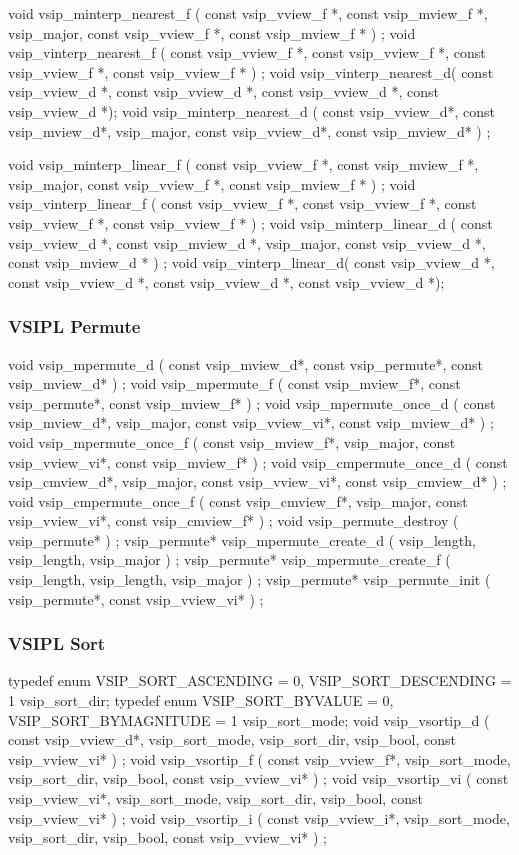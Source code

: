void vsip\_minterp\_nearest\_f ( const vsip\_vview\_f *, const vsip\_mview\_f *, vsip\_major, const vsip\_vview\_f *, const vsip\_mview\_f * ) ;
void vsip\_vinterp\_nearest\_f ( const vsip\_vview\_f *, const vsip\_vview\_f *, const vsip\_vview\_f *, const vsip\_vview\_f * ) ;
void vsip\_vinterp\_nearest\_d( const vsip\_vview\_d *, const vsip\_vview\_d *, const vsip\_vview\_d *, const vsip\_vview\_d *);
void vsip\_minterp\_nearest\_d ( const vsip\_vview\_d*, const vsip\_mview\_d*, vsip\_major, const vsip\_vview\_d*, const vsip\_mview\_d* ) ;

void vsip\_minterp\_linear\_f ( const vsip\_vview\_f *, const vsip\_mview\_f *, vsip\_major, const vsip\_vview\_f *, const vsip\_mview\_f * ) ;
void vsip\_vinterp\_linear\_f ( const vsip\_vview\_f *, const vsip\_vview\_f *, const vsip\_vview\_f *, const vsip\_vview\_f * ) ;
void vsip\_minterp\_linear\_d ( const vsip\_vview\_d *, const vsip\_mview\_d *, vsip\_major, const vsip\_vview\_d *, const vsip\_mview\_d * ) ;
void vsip\_vinterp\_linear\_d( const vsip\_vview\_d *, const vsip\_vview\_d *, const vsip\_vview\_d *, const vsip\_vview\_d *);

\subsubsection*{VSIPL Permute}
void vsip\_mpermute\_d ( const vsip\_mview\_d*, const vsip\_permute*, const vsip\_mview\_d* ) ;
void vsip\_mpermute\_f ( const vsip\_mview\_f*, const vsip\_permute*, const vsip\_mview\_f* ) ;
void vsip\_mpermute\_once\_d ( const vsip\_mview\_d*, vsip\_major, const vsip\_vview\_vi*, const vsip\_mview\_d* ) ;
void vsip\_mpermute\_once\_f ( const vsip\_mview\_f*, vsip\_major, const vsip\_vview\_vi*, const vsip\_mview\_f* ) ;
void vsip\_cmpermute\_once\_d ( const vsip\_cmview\_d*, vsip\_major, const vsip\_vview\_vi*, const vsip\_cmview\_d* ) ;
void vsip\_cmpermute\_once\_f ( const vsip\_cmview\_f*, vsip\_major, const vsip\_vview\_vi*, const vsip\_cmview\_f* ) ;
void vsip\_permute\_destroy ( vsip\_permute* ) ;
vsip\_permute* vsip\_mpermute\_create\_d ( vsip\_length, vsip\_length, vsip\_major ) ;
vsip\_permute* vsip\_mpermute\_create\_f ( vsip\_length, vsip\_length, vsip\_major ) ;
vsip\_permute* vsip\_permute\_init ( vsip\_permute*, const vsip\_vview\_vi* ) ;

\subsubsection*{VSIPL Sort}
typedef enum { VSIP\_SORT\_ASCENDING = 0, VSIP\_SORT\_DESCENDING = 1 } vsip\_sort\_dir;
typedef enum { VSIP\_SORT\_BYVALUE = 0, VSIP\_SORT\_BYMAGNITUDE = 1 } vsip\_sort\_mode;
void vsip\_vsortip\_d ( const vsip\_vview\_d*, vsip\_sort\_mode, vsip\_sort\_dir, vsip\_bool, const vsip\_vview\_vi* ) ;
void vsip\_vsortip\_f ( const vsip\_vview\_f*, vsip\_sort\_mode, vsip\_sort\_dir, vsip\_bool, const vsip\_vview\_vi* ) ;
void vsip\_vsortip\_vi ( const vsip\_vview\_vi*, vsip\_sort\_mode, vsip\_sort\_dir, vsip\_bool, const vsip\_vview\_vi* ) ;
void vsip\_vsortip\_i ( const vsip\_vview\_i*, vsip\_sort\_mode, vsip\_sort\_dir, vsip\_bool, const vsip\_vview\_vi* ) ;